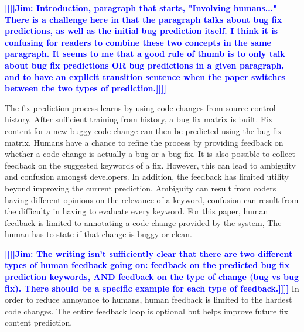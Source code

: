 \documentclass[10pt, conference, letterpaper, compsocconf]{IEEEtran}
\newcommand{\todoc}[2]{{\textcolor{#1} {\textbf{[[#2]]}}}}
\newcommand{\todoblue}[1]{\todoc{blue}{\textbf{[[#1]]}}}
\newcommand{\jim}[1]{\todoblue{Jim: #1}}
\begin{document}
\jim{Introduction, paragraph that starts, "Involving humans..." There is a challenge here in that the paragraph talks about bug fix predictions, as well as the initial bug prediction itself. I think it is confusing for readers to combine these two concepts in the same paragraph. It seems to me that a good rule of thumb is to only talk about bug fix predictions OR bug predictions in a given paragraph, and to have an explicit transition sentence when the paper switches between the two types of prediction.}


The fix prediction process learns by using code changes from source control history. After sufficient
training from history, a bug fix matrix is built. Fix content for a new buggy code change can then be predicted using the bug fix matrix.
 Humans have a chance to refine the process
by providing feedback on whether a code change is actually a bug or a bug fix. It is also possible to collect feedback on the suggested keywords of a fix. However, this can lead to ambiguity and confusion amongst developers. In addition, the feedback has limited utility beyond improving the current prediction. Ambiguity can result from coders having different opinions on the relevance of a keyword, confusion can result from the difficulty in having to evaluate every keyword. For this paper, human feedback is limited to annotating a code change provided by the system, The human has to state if that change is buggy or clean.


\jim{The writing isn't sufficiently clear that there are two different types of human feedback going on: feedback on the predicted bug fix prediction keywords, AND feedback on the type of change (bug vs bug fix). There should be a specific example for each type of feedback.}
In order to reduce annoyance to humans, human feedback is limited to the hardest code changes. The entire feedback
loop is optional but helps improve future fix content prediction.
\end{document}
